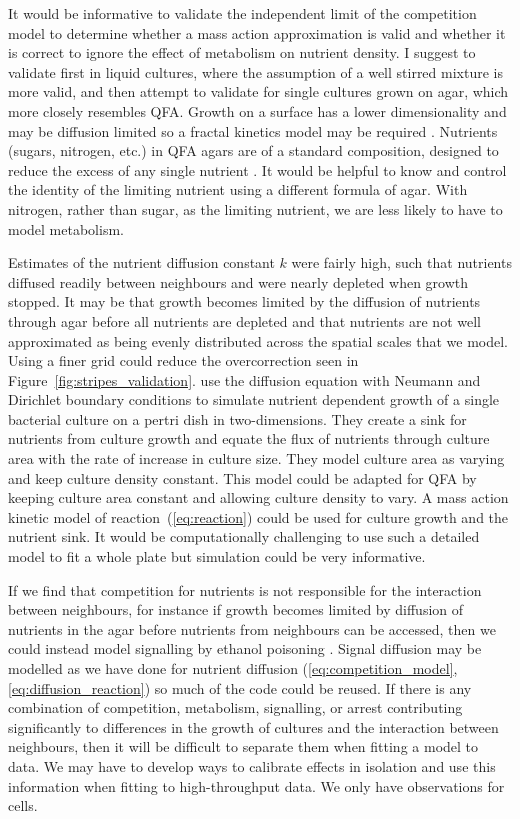 It would be informative to validate the independent limit of the
competition model to determine whether a mass action approximation is
valid and whether it is correct to ignore the effect of metabolism on
nutrient density. I suggest to validate first in liquid cultures,
where the assumption of a well stirred mixture is more valid, and then
attempt to validate for single cultures grown on agar, which more
closely resembles QFA. Growth on a surface has a lower dimensionality
and may be diffusion limited so a fractal kinetics model may be
required \citep{Kopelman1988,savageau1995}. Nutrients (sugars,
nitrogen, etc.) in QFA agars are of a standard composition, designed
to reduce the excess of any single nutrient \citep{Addinall2011}. It
would be helpful to know and control the identity of the limiting
nutrient using a different formula of agar. With nitrogen, rather than
sugar, as the limiting nutrient, we are less likely to have to model
metabolism.

Estimates of the nutrient diffusion constant \(k\) were fairly high,
such that nutrients diffused readily between neighbours and were
nearly depleted when growth stopped. It may be that growth becomes
limited by the diffusion of nutrients through agar before all
nutrients are depleted and that nutrients are not well approximated as
being evenly distributed across the spatial scales that we
model. Using a finer grid could reduce the overcorrection seen in
Figure~\ref{fig:stripes_validation}. \citet{Reo2014} use the diffusion
equation with Neumann and Dirichlet boundary conditions to simulate
nutrient dependent growth of a single bacterial culture on a pertri
dish in two-dimensions. They create a sink for nutrients from culture
growth and equate the flux of nutrients through culture area with the
rate of increase in culture size. They model culture area as varying
and keep culture density constant. This model could be adapted for QFA
by keeping culture area constant and allowing culture density to
vary. A mass action kinetic model of reaction~(\ref{eq:reaction})
could be used for culture growth and the nutrient sink. It would be
computationally challenging to use such a detailed model to fit a
whole plate but simulation could be very informative.

If we find that competition for nutrients is not responsible for the
interaction between neighbours, for instance if growth becomes limited
by diffusion of nutrients in the agar before nutrients from neighbours
can be accessed, then we could instead model signalling by ethanol
poisoning \citep{fujita2006}. Signal diffusion may be modelled as we
have done for nutrient diffusion
(\ref{eq:competition_model},\ref{eq:diffusion_reaction}) so much of
the code could be reused. If there is any combination of competition,
metabolism, signalling, or arrest contributing significantly to
differences in the growth of cultures and the interaction between
neighbours, then it will be difficult to separate them when fitting a
model to data. We may have to develop ways to calibrate effects in
isolation and use this information when fitting to high-throughput
data. We only have observations for cells.

